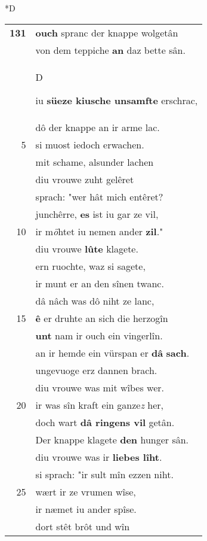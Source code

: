 \documentclass[8pt,a4paper,notitlepage]{article}
\begin{document}
\begin{table}[ht]
\begin{minipage}[t]{0.5\linewidth}
\small
\begin{center}*D
\end{center}
\begin{tabular}{rl}
\textbf{131} & \textbf{ouch} spranc der knappe wolgetân\\ 
 & von dem teppiche \textbf{an} daz bette sân.\\ 
 & \begin{large}D\end{large}iu \textbf{süeze kiusche unsamfte} erschrac,\\ 
 & dô der knappe an ir arme lac.\\ 
5 & si muost iedoch erwachen.\\ 
 & mit schame, alsunder lachen\\ 
 & diu vrouwe zuht gelêret\\ 
 & sprach: "wer hât mich entêret?\\ 
 & junchêrre, \textbf{es} ist iu gar ze vil,\\ 
10 & ir m\textit{ö}htet iu nemen ander \textbf{zil}."\\ 
 & diu vrouwe \textbf{lûte} klagete.\\ 
 & ern ruochte, waz si sagete,\\ 
 & ir munt er an den sînen twanc.\\ 
 & dâ nâch was dô niht ze lanc,\\ 
15 & \textbf{ê} er druhte an sich die herzogîn\\ 
 & \textbf{unt} nam ir ouch ein vingerlîn.\\ 
 & an ir hemde ein vürspan er \textbf{dâ} \textbf{sach}.\\ 
 & ungevuoge erz dannen brach.\\ 
 & diu vrouwe was mit wîbes wer.\\ 
20 & ir was sîn kraft ein ganze\textit{z} her,\\ 
 & doch wart \textbf{dâ ringens vil} getân.\\ 
 & Der knappe klagete \textbf{den} hunger sân.\\ 
 & diu vrouwe was ir \textbf{liebes lîht}.\\ 
 & si sprach: "ir sult mîn ezzen niht.\\ 
25 & wært ir ze vrumen wîse,\\ 
 & ir næmet iu ander spîse.\\ 
 & dort stêt brôt und wîn\\ 

\end{tabular}
\end{minipage}
\end{table}
\end{document}
